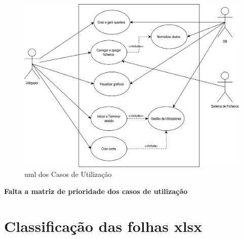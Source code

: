 \begin{figure}[h]
\centering
\includegraphics[width=14cm]{./img/usecase_uml}
\caption{\gls{uml} dos Casos de Utilização}
\label{fig:umlCasosUtilizacao}
\end{figure}
\textbf{ Falta a matriz de prioridade dos casos de utilização}


\chapter{Classificação das folhas \gls{xlsx}}
\label{ch:asd}









